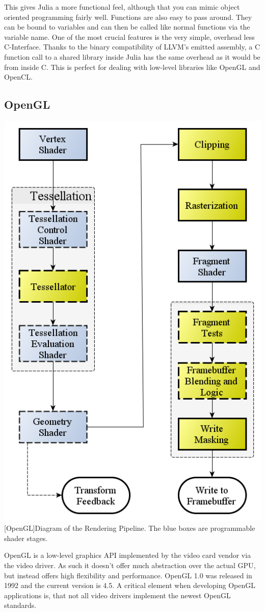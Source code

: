 This gives Julia a more functional feel, although that you can mimic object oriented programming fairly well.
Functions are also easy to pass around. They can be bound to variables and can then be called like normal functions via the variable name.
One of the most crucial features is the very simple, overhead less C-Interface. 
Thanks to the binary compatibility of LLVM's emitted assembly, a C function call to a shared library inside Julia has the same overhead as it would be from inside C\cite{CCALL}. 
This is perfect for dealing with low-level libraries like \ac{OpenGL} and \ac{OpenCL}.



\subsection{\ac{OpenGL}}

\vspace{1em}
\begin{minipage}{\linewidth}
    \centering
    \includegraphics[width=0.5\linewidth]{graphics/RenderingPipeline.png}
    [OpenGL]{Diagram of the Rendering Pipeline. The blue boxes are programmable shader stages. \cite{OpenGLPipeline}}
    \label{fig:opengl}
\end{minipage}


\ac{OpenGL} is a low-level graphics API implemented by the video card vendor via the video driver. 
As such it doesn't offer much abstraction over the actual \ac{GPU}, but instead offers high flexibility and performance.
\ac{OpenGL} 1.0 was released in 1992 and the current version is 4.5.
A critical element when developing \ac{OpenGL} applications is, that not all video drivers implement the newest \ac{OpenGL} standards.

